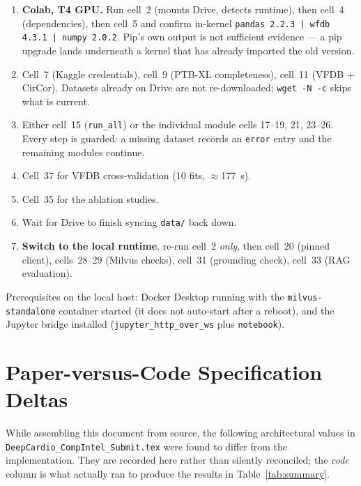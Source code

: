 \documentclass[11pt,a4paper]{article}
\newcommand{\code}[1]{\texttt{\small #1}}
\begin{document}
\begin{enumerate}[leftmargin=1.5em,itemsep=2pt]
  \item \textbf{Colab, T4 GPU.} Run cell~2 (mounts Drive, detects runtime),
        then cell~4 (dependencies), then cell~5 and confirm in-kernel
        \code{pandas 2.2.3 | wfdb 4.3.1 | numpy 2.0.2}. Pip's own output is
        not sufficient evidence --- a pip upgrade lands underneath a kernel
        that has already imported the old version.
  \item Cell~7 (Kaggle credentials), cell~9 (PTB-XL completeness), cell~11
        (VFDB + CirCor). Datasets already on Drive are not re-downloaded;
        \code{wget -N -c} skips what is current.
  \item Either cell~15 (\code{run\_all}) or the individual module cells
        17--19, 21, 23--26. Every step is guarded: a missing dataset
        records an \code{error} entry and the remaining modules continue.
  \item Cell~37 for VFDB cross-validation (10 fits, $\approx$177~s).
  \item Cell~35 for the ablation studies.
  \item Wait for Drive to finish syncing \code{data/} back down.
  \item \textbf{Switch to the local runtime}, re-run cell~2 \emph{only},
        then cell~20 (pinned client), cells~28--29 (Milvus checks),
        cell~31 (grounding check), cell~33 (RAG evaluation).
\end{enumerate}

\noindent
Prerequisites on the local host: Docker Desktop running with the
\code{milvus-standalone} container started (it does not auto-start after a
reboot), and the Jupyter bridge installed
(\code{jupyter\_http\_over\_ws} plus \code{notebook}).

\appendix
\section{Paper-versus-Code Specification Deltas}
\label{app:delta}

While assembling this document from source, the following architectural
values in \code{DeepCardio\_CompIntel\_Submit.tex} were found to differ
from the implementation. They are recorded here rather than silently
reconciled; the \emph{code} column is what actually ran to produce the
results in Table~\ref{tab:summary}.
\end{document}
